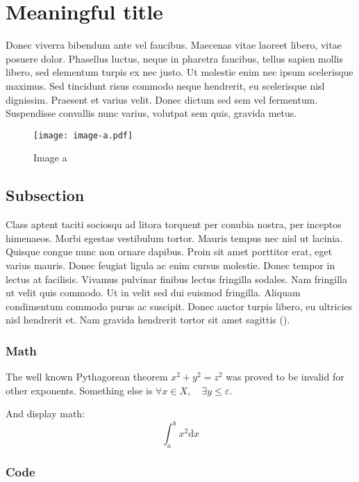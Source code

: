 \documentclass{jcls}
\begin{document}
\section{Meaningful title}

Donec viverra bibendum ante vel faucibus. Maecenas vitae laoreet libero, vitae posuere dolor. Phasellus luctus, neque in pharetra faucibus, tellus sapien mollis libero, sed elementum turpis ex nec justo. Ut molestie enim nec ipsum scelerisque maximus. Sed tincidunt risus commodo neque hendrerit, eu scelerisque nisl dignissim. Praesent et varius velit. Donec dictum sed sem vel fermentum. Suspendisse convallis nunc varius, volutpat sem quis, gravida metus.

\begin{figure}
	\texttt{[image: image-a.pdf]}
	\caption{Image a}
\end{figure}
%
%
%
%

\subsection{Subsection}

Class aptent taciti sociosqu ad litora torquent per conubia nostra, per inceptos himenaeos. Morbi egestas vestibulum tortor. Mauris tempus nec nisl ut lacinia. Quisque congue nunc non ornare dapibus. Proin sit amet porttitor erat, eget varius mauris. Donec feugiat ligula ac enim cursus molestie. Donec tempor in lectus at facilisis. Vivamus pulvinar finibus lectus fringilla sodales. Nam fringilla ut velit quis commodo. Ut in velit sed dui euismod fringilla. Aliquam condimentum commodo purus ac suscipit. Donec auctor turpis libero, eu ultricies nisl hendrerit et. Nam gravida hendrerit tortor sit amet sagittis (\cite{dirac}).

\subsubsection{Math}

The well known Pythagorean theorem $x^2 + y^2 = z^2$ was proved to be
invalid for other exponents. Something else is
\(\forall x \in X, \quad \exists y \leq ε\).

And display math:
\[
	\int_a^b x^2  \mathrm{d} x
\]

\subsubsection{Code}
\end{document}
